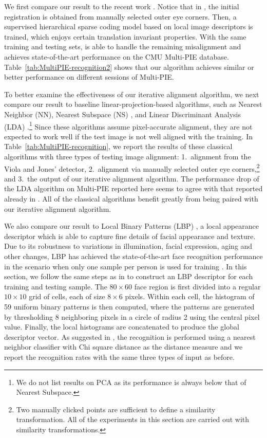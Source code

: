 We first compare our result to the recent work
\cite{Yang2010-CVPR}. Notice that in \cite{Yang2010-CVPR}, the
initial registration is obtained from manually selected outer
eye corners. Then, a supervised hierarchical sparse coding
model based on local image descriptors is trained, which enjoys
certain translation invariant properties. With the same
training and testing sets, \cite{Yang2010-CVPR} is able to
handle the remaining misalignment and achieves state-of-the-art
performance on the CMU Multi-PIE database.
Table~\ref{tab:MultiPIE-recognition2} shows that our algorithm
achieves similar or better performance on different sessions of
Multi-PIE.

To better examine the effectiveness of our iterative alignment
algorithm, we next compare our result to baseline
linear-projection-based algorithms, such as Nearest Neighbor
(NN), Nearest Subspace (NS) \cite{Lee2005-PAMI}, and Linear
Discriminant Analysis (LDA)
\cite{Belhumeur1997-PAMI}.\footnote{We do not list results on
PCA \cite{Turk1991-CVPR} as its performance is always below
that of Nearest Subspace.} Since these algorithms assume
pixel-accurate alignment, they are not expected to work well if
the test image is not well aligned with the training. In
Table~\ref{tab:MultiPIE-recognition}, we report the results of
these classical algorithms with three types of testing image
alignment: 1.\ alignment from the Viola and Jones' detector,
2.\ alignment via manually selected outer eye
corners,\footnote{Two manually clicked points are sufficient to
define a similarity transformation. All of the experiments in
this section are carried out with similarity transformations.}
and 3.\ the output of our iterative alignment algorithm. The
performance drop of the LDA algorithm on Multi-PIE reported
here seems to agree with that reported already in
\cite{Gross2008-FGR}.  All of the classical algorithms benefit
greatly from being paired with our iterative alignment
algorithm.

We also compare our result to Local Binary Patterns (LBP)
\cite{Ahonen2006-PAMI}, a local appearance descriptor which is
able to capture fine details of facial appearance and texture.
Due to its robustness to variations in illumination, facial
expression, aging and other changes, LBP has achieved the
state-of-the-art face recognition performance in the scenario
when only one sample per person is used for training
\cite{Tan06facerecognition}. In this section, we follow the same
steps as in \cite{Ahonen2006-PAMI} to construct an LBP
descriptor for each training and testing sample. The $80\times
60$ face region is first divided into a regular $10\times 10$
grid of cells, each of size $8\times 6$ pixels. Within each
cell, the histogram of 59 uniform binary patterns is then
computed, where the patterns are generated by thresholding 8
neighboring pixels in a circle of radius 2 using the central
pixel value. Finally, the local histograms are concatenated to
produce the global descriptor vector. As suggested in
\cite{Ahonen2006-PAMI}, the recognition is performed using a
nearest neighbor classifier with Chi square distance as the
distance measure and we report the recognition rates with the
same three types of input as before.

